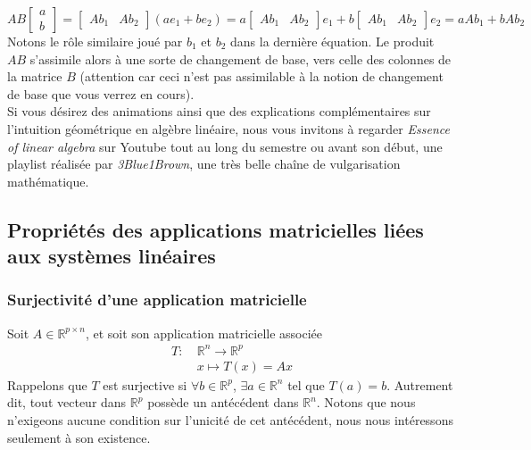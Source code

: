 \documentclass{article}
\newcommand{\R}{\mathbb{R}}
\newcommand{\cross}{\times}
\begin{document}
$$AB\begin{bmatrix}
a \\ b
\end{bmatrix} = \begin{bmatrix} Ab_1 & Ab_2 \end{bmatrix}(ae_1+be_2)= a\begin{bmatrix} Ab_1 & Ab_2 \end{bmatrix}e_1 + b\begin{bmatrix} Ab_1 & Ab_2 \end{bmatrix}e_2 = aAb_1 + bAb_2
$$
Notons le rôle similaire joué par $b_1$ et $b_2$ dans la dernière équation. Le produit $AB$ s'assimile alors à une sorte de changement de base, vers celle des colonnes de la matrice $B$ (attention car ceci n'est pas assimilable à la notion de changement de base que vous verrez en cours).\\
\noindent Si vous désirez des animations ainsi que des explications complémentaires sur l'intuition géométrique en algèbre linéaire, nous vous invitons à regarder \textit{Essence of linear algebra} sur Youtube tout au long du semestre ou avant son début, une playlist réalisée par \textit{3Blue1Brown}, une très belle chaîne de vulgarisation mathématique.

\newpage

\subsection{Propriétés des applications matricielles liées aux systèmes linéaires}
\subsubsection{Surjectivité d'une application matricielle}
\noindent Soit $A \in \R^{p \cross n}$, et soit son application matricielle associée
\begin{align*}
    T: \ &\R^n \to \R^p\\
    &x \mapsto T(x) = Ax
\end{align*}
Rappelons que $T$ est surjective si $\forall b \in \R^p$, $\exists a \in \R^n$ tel que $T(a)=b$. Autrement dit, tout vecteur dans $\R^p$ possède un antécédent dans $\R^n$. Notons que nous n'exigeons aucune condition sur l'unicité de cet antécédent, nous nous intéressons seulement à son existence. \\
\end{document}
